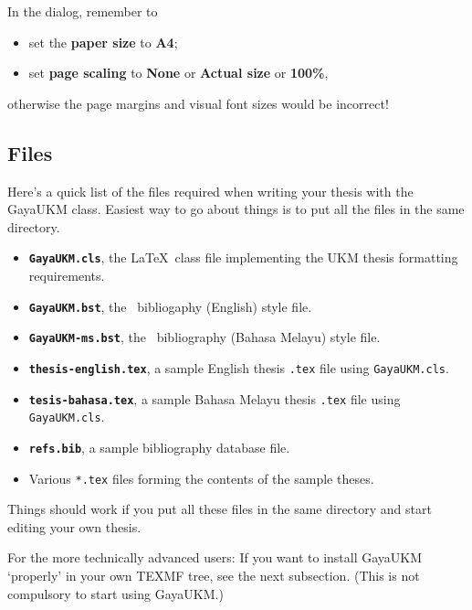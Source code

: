 \documentclass[a4paper,12pt]{scrartcl}
\newcommand{\GayaUKM}{\textsf{GayaUKM}}
\begin{document}
In the  dialog, remember to
\begin{itemize}[noitemsep]
\item set the \textbf{paper size} to \textbf{A4};
\item set \textbf{page scaling} to \textbf{None} or \textbf{Actual size} or \textbf{100\%},
\end{itemize}
otherwise the page margins and visual font sizes would be incorrect!

\subsection{Files}

Here's a quick list of the files required when writing your thesis with the \GayaUKM{} class. Easiest way to go about things is to put all the files in the same directory. %
%
\begin{itemize}[noitemsep]
\item \texttt{\bfseries GayaUKM.cls}, the \LaTeX\ class file implementing the \gls{UKM} thesis formatting requirements.
\item \texttt{\bfseries GayaUKM.bst}, the \BibTeX\ bibliogaphy (English) style file.
\item \texttt{\bfseries GayaUKM-ms.bst}, the \BibTeX\ bibliography (Bahasa Melayu) style file.
\item \texttt{\bfseries thesis-english.tex}, a sample English thesis \texttt{.tex} file using \texttt{GayaUKM.cls}.

\item \texttt{\bfseries tesis-bahasa.tex}, a sample Bahasa Melayu thesis \texttt{.tex} file using \texttt{GayaUKM.cls}.

\item \texttt{\bfseries refs.bib}, a sample bibliography database file. %

\item Various \texttt{*.tex} files forming the contents of the sample theses.
\end{itemize}

{\large Things should work if you put all these files in the same directory and start editing your own thesis.}

For the more technically advanced users: If you want to install \GayaUKM{} `properly' in your own TEXMF tree, see the next subsection. (This is not compulsory to start using \GayaUKM{}.)
\end{document}
